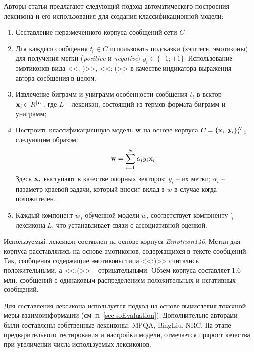     Авторы статьи предлагают следующий подход автоматического построения
    лексикона и его использования для создания классификационной модели:
    \begin{enumerate}
        \item Составление неразмеченного корпуса сообщений сети \twitter $C$.
        \item Для каждого сообщения $t_i \in C$ использовать подсказки
            (хэштеги, эмотиконы) для получения метки ({\it positive} и {\it negative})
            $y_i \in \{-1; +1\}$. Использование эмотиконов вида <<:-)>>, <<:-(>>
            в качестве индикатора выражения автора сообщения в целом.
        \item Извлечение биграмм и униграмм особенности сообщения $t_i$ в
            вектор ${\bf x}_i \in R^{|L|}$, где $L$ -- лексикон, состоящий из
            термов формата биграмм и униграмм;
        \item Построить классификационную модель ${\bf w}$ на основе корпуса
            $C = \{{\bf x}_i, {\bf y}_i \}_{i=1}^{N}$ следующим образом:
        \begin{equation}
            {\bf w} = \sum\limits_{i=1}^{N}\alpha_i y_i {\bf x}_i
        \end{equation}
        Здесь ${\bf x}_i$ выступают в качестве опорных векторов; $y_i$ -- их метки;
        $\alpha_i$ -- параметр краевой задачи, который вносит вклад в
        $w$ в случае когда положителен.
        \item Каждый компонент $w_j$ обученной модели $w$, соответствует компоненту $l_i$
            лексикона $L$, что устанавливает связи с ассоциативной оценкой.
    \end{enumerate}

    Используемый лексикон составлен на основе \twitter корпуса {\it Emoticon140}.
    Метки для корпуса расставлялись на основе эмотиконов, содержащихся в
    тексте сообщений.
    Так, сообщения содержащие эмотиконы типа <<:)>> считались положительными,
    а <<:(>> -- отрицательными.
    Объем корпуса составляет $1.6$ млн. сообщений с одинаковым распределением
    положительных и негативных сообщений.

    Для составления лексикона используется подход на основе вычисления
    точечной меры взаимоинформации (см. п. \ref{sec:soEvaluation}).
    Дополнительно авторами были составлены собственные лексиконы: MPQA, BingLiu, NRC.
    На этапе предварительного тестирования и настройки модели, отмечается прирост
    качества при увеличении числа используемых лексиконов.

